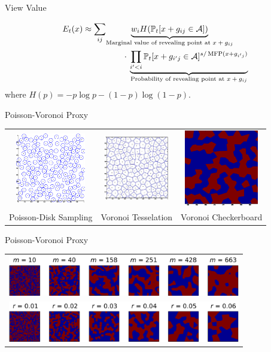\begin{tframe}{View Value}
\begin{center}
\begin{align*}
E_t(x) \approx \sum_{ij}& 
\underset{\text{Marginal value of revealing point at $x+g_{ij}$}}
{\underbrace{w_i H(\mathbb{P}_t[x+g_{ij}\in\mathcal{A}])}}\\
&\qquad\cdot\,
\underset{\text{Probability of revealing point at $x+g_{ij}$}}
{\underbrace{\prod_{i^{\prime}<i}\mathbb{P}_t[x+g_{i^{\prime}j}\in\mathcal{A}]^{s/\operatorname{MFP}(x+g_{i^{\prime}j})}}}
\end{align*}
where $H(p) = -p\log p - (1-p)\log(1-p)$.
\end{center}
\end{tframe}

\begin{tframe}{Poisson-Voronoi Proxy}
\bigskip
\begin{tabular}{ccc}
\includegraphics[height=1.2in]{media_exploration/poisson_disk}&
\includegraphics[height=1.1in]{media_exploration/voronoi}&
\includegraphics[height=1.3in]{media_exploration/voronoi_chex}\\
Poisson-Disk Sampling &
Voronoi Tesselation &
Voronoi Checkerboard
\end{tabular}
\end{tframe}

\begin{tframe}{Poisson-Voronoi Proxy}
\begin{center}
\begin{tabular}{c}
\includegraphics[width=4in]{media_exploration/entropy_ising}\\
\includegraphics[width=4in]{media_exploration/entropy_chex}
\end{tabular}
\end{center}
\end{tframe}

